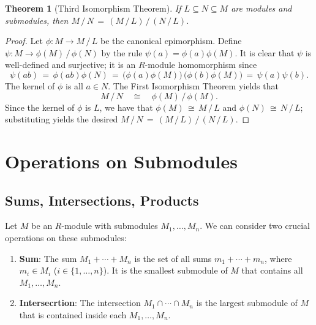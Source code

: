 \documentclass[11pt]{article}
\newtheorem{theorem}{Theorem}
\begin{document}
\begin{adjustwidth}{0.5cm}{}
  \begin{theorem}[Third Isomorphism Theorem]
    If $L \subseteq N \subseteq  M$ are modules and submodules, then $M \, / \, N \, = \, (M \, / \, L) \, / \, (N \, / \, L)$.
  \end{theorem}
  \begin{proof}
    Let $\phi : M \to M \, / \, L$ be the canonical epimorphism. Define $\psi : M \to \phi(M) \, / \, \phi(N)$ by the rule $\psi(a) = \phi(a)\phi(M)$. It is clear that $\psi$ is well-defined and surjective; it is an $R$-module homomorphism since
    \[
      \psi(ab) \, = \, \phi(ab) \phi(N) \, = \, \big(\phi(a) \phi(M)\big) \, \big(\phi(b) \phi(M) \big) \, = \, \psi(a) \psi(b).
    \]
    The kernel of $\phi$ is all $a \in N$. The First Isomorphism Theorem yields that
    \[
      M \, / \, N \quad \cong \quad \phi(M) \, / \, \phi(M).
    \]
    Since the kernel of $\phi$ is $L$, we have that $\phi(M) \, \cong \, M \, / \, L$ and $\phi(N) \, \cong \, N \, / \, L$; substituting yields the desired $M \, / \, N \, = \, (M \, / \, L) \, / \, (N \, / \, L)$.
  \end{proof}
\end{adjustwidth}


\section{Operations on Submodules}


\subsection{Sums, Intersections, Products}

Let $M$ be an $R$-module with submodules $M_{1}, \ldots, M_{n}$. We can consider two crucial operations on these submodules:
\begin{enumerate}
	\item \textbf{Sum}: The sum $M_{1} + \cdots + M_{n}$ is the set of all sums $m_{1} + \cdots + m_{n}$, where $m_{i} \in M_{i}$ ($i \in \{ 1, \ldots, n \}$). It is the smallest submodule of $M$ that contains all $M_{1}, \ldots, M_{n}$.
	\item \textbf{Intersecrtion}: The intersection $M_{1} \cap \cdots \cap M_{n}$ is the largest submodule of $M$ that is contained inside each $M_{1}, \ldots, M_{n}$.
\end{enumerate}
\end{document}
